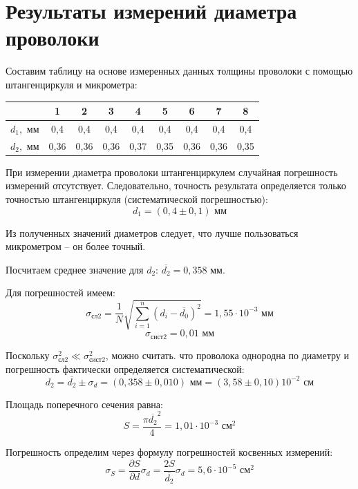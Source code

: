 \section{Результаты измерений диаметра проволоки}


Составим таблицу на основе измеренных данных толщины проволоки с помощью штангенциркуля и микрометра:

\begin{center}
    \begin{tabular}{|c|c|c|c|c|c|c|c|c|}
        \hline
                    & 1    & 2    & 3    & 4    & 5    & 6    & 7    & 8    \\
        \hline
        $d_{1},$ мм & 0,4  & 0,4  & 0,4  & 0,4  & 0,4  & 0,4  & 0,4  & 0,4  \\
        \hline
        $d_{2},$ мм & 0,36 & 0,36 & 0,36 & 0,37 & 0,35 & 0,36 & 0,36 & 0,35 \\
        \hline
    \end{tabular}
\end{center}

При измерении диаметра проволоки штангенциркулем случайная погрешность измерений отсутствует. Следовательно, точность результата определяется только точностью штангенциркуля (систематической погрешностью):
\[d_{1} = (0,4 \pm 0,1) \text{ мм}\]

Из полученных значений диаметров следует, что лучше пользоваться микрометром -- он более точный.

Посчитаем среднее значение для $d_{2}$: $\overline{d_{2}} = 0,358$ мм.

Для погрешностей имеем:
\[\sigma_{\text{сл}2} = \frac{1}{N}\sqrt{\sum_{i = 1}^{n}{(d_i-\overline{d_{0}})^2}} = 1,55\cdot 10^{-3} \text{ мм}\]
\[\sigma_{\text{сист}2} = 0,01 \text{ мм}\]

Поскольку $\sigma_{\text{сл}2}^2 \ll \sigma_{\text{сист}2}^2$, можно считать. что проволока однородна по диаметру и погрешность фактически определяется систематической:
\[d_{2} = \overline{d_{2}} \pm \sigma_d = (0,358 \pm 0,010) \text{ мм} =  (3,58 \pm 0,10)10^{-2} \text{ см}\]

Площадь поперечного сечения равна:
\[S = \frac{\pi \overline{d_{2}}^2}{4} = 1,01\cdot 10^{-3}\text{ см}^{2}\]

Погрешность определим через формулу погрешностей косвенных измерений:
\[\sigma_S = \frac{\partial{S}}{\partial{d}}\sigma_d = \frac{2S}{\overline{d_{2}}}\sigma_d = 5,6\cdot 10^{-5}\text{ см}^{2}\]\\\\\\


